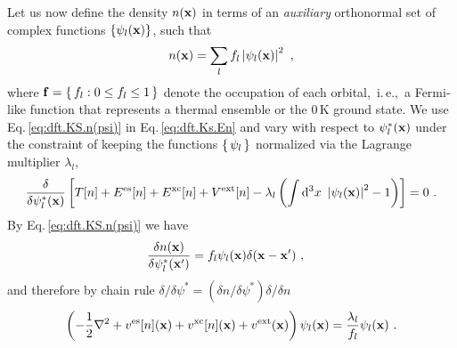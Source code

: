 \documentclass[a4paper,12pt]{book}
\renewcommand{\d}{{\rm d}}
\begin{document}
Let us now define the density $n({\bf x})$ in terms of an \emph{auxiliary} orthonormal set of complex functions $\{ \psi_l ({\bf x}) \}$, such that
\begin{align}
	n({\bf x}) = \sum_l f_l \left\lvert \psi_l ({\bf x}) \right\rvert^2~,
	\label{eq:dft.KS.n(psi)}
\end{align}
where ${\bf f}=\set{f_l : 0 \leq f_l \leq 1}$ denote the occupation of each orbital,~i.\,e.,~a Fermi-like function that represents a thermal ensemble or the 0\,K ground state. We use Eq.\,\eqref{eq:dft.KS.n(psi)} in Eq.\,\eqref{eq:dft.Ks.En} and vary with respect to $\psi^\ast_l ({\bf x})$ under the constraint of keeping the functions $\set{\psi_l}$ normalized via the Lagrange multiplier $\lambda_l$,
\begin{align}
	\frac{\delta}{\delta \psi^\ast_l ({\bf x})}
		\left[
			T[n] +  E^{\rm es}[n] + E^{\rm xc} [n] + V^{\rm ext}[n]
			- \lambda_l \left(
				\int \d^3 x ~ \left\lvert \psi_l ({\bf x}) \right\rvert^2 - 1
			\right)
		\right]
		= 0~.
	\label{eq:dft.Ks.variation.1}
\end{align}
By Eq.\,\eqref{eq:dft.KS.n(psi)} we have
\begin{align}
	\frac{\delta n({\bf x})}{\delta \psi^\ast_l ({\bf x}')}
		&= f_l \psi_l ({\bf x}) \delta ({\bf x} - {\bf x}')~,
	\label{eq:dft.KS.dn}
\end{align}
and therefore by chain rule 
$\delta / \delta \psi^\ast = (\delta n / \delta \psi^\ast) \delta / \delta n$
\begin{align}
	\left(
		-\frac{1}{2} \nabla^2 
		+ v^{\rm es} [n] ({\bf x})
		+ v^{\rm xc} [n] ({\bf x})
		+ v^{\rm ext}  ({\bf x})
	\right) \psi_l ({\bf x})
	= \frac{\lambda_l}{f_l} \psi_l ({\bf x})~.
	\label{eq:dft.KS.1}
\end{align}
\end{document}
